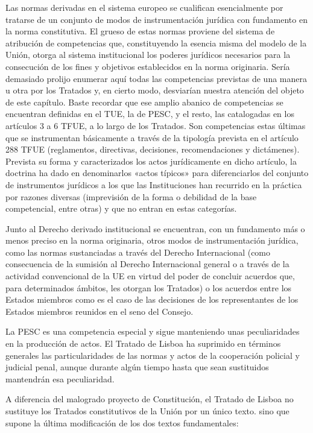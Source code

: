 \documentclass[10pt,a4paper]{article}
\begin{document}
Las normas derivadas en el sistema europeo se cualifican esencialmente por tratarse de un conjunto de modos de instrumentación jurídica con fundamento en la norma constitutiva. El grueso de estas normas proviene del sistema de atribución de competencias que, constituyendo la esencia misma del modelo de la Unión, otorga al sistema institucional los poderes jurídicos necesarios para la consecución de los fines y objetivos establecidos en la norma originaria. Sería demasiado prolijo enumerar aquí todas las competencias previstas de una manera u otra por los Tratados y, en cierto modo, desviarían nuestra atención del objeto de este capítulo. Baste recordar que ese amplio abanico de competencias se encuentran definidas en el TUE, la de PESC, y el resto, las catalogadas en los artículos 3 a 6 TFUE, a lo largo de los Tratados. Son competencias estas últimas que se instrumentan básicamente a través de la tipología prevista en el artículo 288 TFUE (reglamentos, directivas, decisiones, recomendaciones y dictámenes). Prevista su forma y caracterizados los actos jurídicamente en dicho artículo, la doctrina ha dado en denominarlos «actos típicos» para diferenciarlos del conjunto de instrumentos jurídicos a los que las Instituciones han recurrido en la práctica por razones diversas (imprevisión de la forma o debilidad de la base competencial, entre otras) y que no entran en estas categorías.

Junto al Derecho derivado institucional se encuentran, con un fundamento más o menos preciso en la norma originaria, otros modos de instrumentación jurídica, como las normas sustanciadas a través del Derecho Internacional (como consecuencia de la sumisión al Derecho Internacional general o a través de la actividad convencional de la UE en virtud del poder de concluir acuerdos que, para determinados ámbitos, les otorgan los Tratados) o los acuerdos entre los Estados miembros como es el caso de las decisiones de los representantes de los Estados miembros reunidos en el seno del Consejo.

La PESC es una competencia especial y sigue manteniendo unas peculiaridades en la producción de actos. El Tratado de Lisboa ha suprimido en términos generales las particularidades de las normas y actos de la cooperación policial y judicial penal, aunque durante algún tiempo hasta que sean sustituidos mantendrán esa peculiaridad.




A diferencia del malogrado proyecto de Constitución, el Tratado de Lisboa no sustituye los Tratados constitutivos de la Unión por un único texto. sino que supone la última modificación de los dos textos fundamentales:
\end{document}
